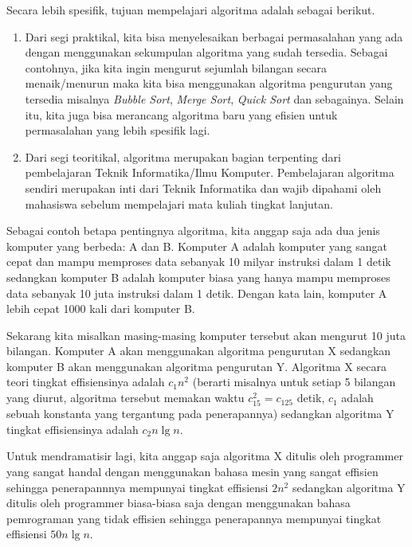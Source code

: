 Secara lebih spesifik, tujuan mempelajari algoritma adalah sebagai berikut.
\begin{enumerate}
	\item Dari segi praktikal, kita bisa menyelesaikan berbagai permasalahan yang ada dengan menggunakan sekumpulan algoritma yang sudah tersedia. Sebagai contohnya, jika kita ingin mengurut sejumlah bilangan secara menaik/menurun maka kita bisa menggunakan algoritma pengurutan yang tersedia misalnya \textit{Bubble Sort}, \textit{Merge Sort}, \textit{Quick Sort} dan sebagainya. Selain itu, kita juga bisa merancang algoritma baru yang efisien untuk permasalahan yang lebih spesifik lagi.
	\item Dari segi teoritikal, algoritma merupakan bagian terpenting dari pembelajaran Teknik Informatika/Ilmu Komputer. Pembelajaran algoritma sendiri merupakan inti dari Teknik Informatika dan wajib dipahami oleh mahasiswa sebelum mempelajari mata kuliah tingkat lanjutan.
\end{enumerate}

Sebagai contoh betapa pentingnya algoritma, kita anggap saja ada dua jenis komputer yang berbeda: A dan B. Komputer A adalah komputer yang sangat cepat dan mampu memproses data sebanyak 10 milyar instruksi dalam 1 detik sedangkan komputer B adalah komputer biasa yang hanya mampu memproses data sebanyak 10 juta instruksi dalam 1 detik. Dengan kata lain, komputer A lebih cepat 1000 kali dari komputer B.

Sekarang kita misalkan masing-masing komputer tersebut akan mengurut 10 juta bilangan. Komputer A akan menggunakan algoritma pengurutan X sedangkan komputer B akan menggunakan algoritma pengurutan Y. Algoritma X secara teori tingkat effisiensinya adalah $c_1n^2$ (berarti misalnya untuk setiap 5 bilangan yang diurut, algoritma tersebut memakan waktu $c_15^2 = c_125$ detik, $c_1$ adalah sebuah konstanta yang tergantung pada penerapannya) sedangkan algoritma Y tingkat effisiensinya adalah $c_2n\lg n$. 

Untuk mendramatisir lagi, kita anggap saja algoritma X ditulis oleh programmer yang sangat handal dengan menggunakan bahasa mesin yang sangat effisien sehingga penerapannnya mempunyai tingkat effisiensi $2n^2$ sedangkan algoritma Y ditulis oleh programmer biasa-biasa saja dengan menggunakan bahasa pemrograman yang tidak effisien sehingga penerapannya mempunyai tingkat effisiensi $50n\lg n$.

